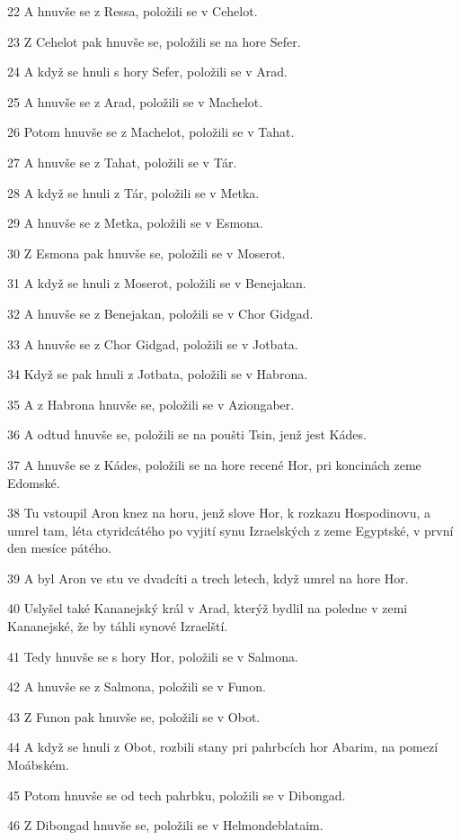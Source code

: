 \par 22 A hnuvše se z Ressa, položili se v Cehelot.
\par 23 Z Cehelot pak hnuvše se, položili se na hore Sefer.
\par 24 A když se hnuli s hory Sefer, položili se v Arad.
\par 25 A hnuvše se z Arad, položili se v Machelot.
\par 26 Potom hnuvše se z Machelot, položili se v Tahat.
\par 27 A hnuvše se z Tahat, položili se v Tár.
\par 28 A když se hnuli z Tár, položili se v Metka.
\par 29 A hnuvše se z Metka, položili se v Esmona.
\par 30 Z Esmona pak hnuvše se, položili se v Moserot.
\par 31 A když se hnuli z Moserot, položili se v Benejakan.
\par 32 A hnuvše se z Benejakan, položili se v Chor Gidgad.
\par 33 A hnuvše se z Chor Gidgad, položili se v Jotbata.
\par 34 Když se pak hnuli z Jotbata, položili se v Habrona.
\par 35 A z Habrona hnuvše se, položili se v Aziongaber.
\par 36 A odtud hnuvše se, položili se na poušti Tsin, jenž jest Kádes.
\par 37 A hnuvše se z Kádes, položili se na hore recené Hor, pri koncinách zeme Edomské.
\par 38 Tu vstoupil Aron knez na horu, jenž slove Hor, k rozkazu Hospodinovu, a umrel tam, léta ctyridcátého po vyjití synu Izraelských z zeme Egyptské, v první den mesíce pátého.
\par 39 A byl Aron ve stu ve dvadcíti a trech letech, když umrel na hore Hor.
\par 40 Uslyšel také Kananejský král v Arad, kterýž bydlil na poledne v zemi Kananejské, že by táhli synové Izraelští.
\par 41 Tedy hnuvše se s hory Hor, položili se v Salmona.
\par 42 A hnuvše se z Salmona, položili se v Funon.
\par 43 Z Funon pak hnuvše se, položili se v Obot.
\par 44 A když se hnuli z Obot, rozbili stany pri pahrbcích hor Abarim, na pomezí Moábském.
\par 45 Potom hnuvše se od tech pahrbku, položili se v Dibongad.
\par 46 Z Dibongad hnuvše se, položili se v Helmondeblataim.
